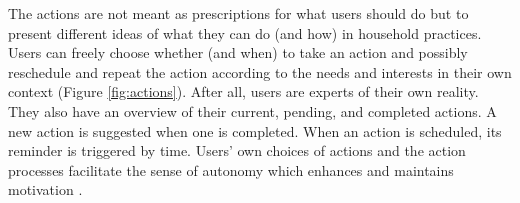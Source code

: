 The actions are not meant as prescriptions for what users should do but to present different ideas of what they can do (and how) in household practices. 
Users can freely choose whether (and when) to take an action and possibly reschedule and repeat the action according to the needs and interests in their own context (Figure \ref{fig:actions}). After all, users are experts of their own reality. They also have an overview of their current, pending, and completed actions.
A new action is suggested when one is completed. %
When an action is scheduled, its reminder is triggered by time. Users' own choices of actions and the action processes facilitate the sense of autonomy which enhances and maintains motivation \cite{Ryan2000}.

